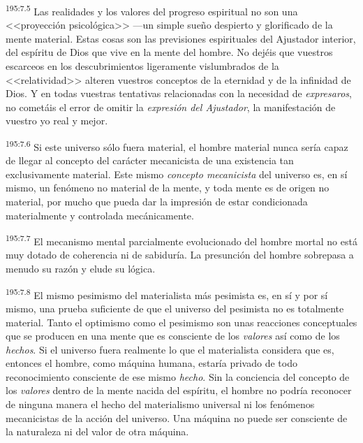 \par 
\textsuperscript{195:7.5} Las realidades y los valores del progreso espiritual no son una <<proyección psicológica>> ---un simple sueño despierto y glorificado de la mente material. Estas cosas son las previsiones espirituales del Ajustador interior, del espíritu de Dios que vive en la mente del hombre. No dejéis que vuestros escarceos en los descubrimientos ligeramente vislumbrados de la <<relatividad>> alteren vuestros conceptos de la eternidad y de la infinidad de Dios. Y en todas vuestras tentativas relacionadas con la necesidad de \textit{expresaros}, no cometáis el error de omitir la \textit{expresión del Ajustador}, la manifestación de vuestro yo real y mejor.

\par 
\textsuperscript{195:7.6} Si este universo sólo fuera material, el hombre material nunca sería capaz de llegar al concepto del carácter mecanicista de una existencia tan exclusivamente material. Este mismo \textit{concepto mecanicista} del universo es, en sí mismo, un fenómeno no material de la mente, y toda mente es de origen no material, por mucho que pueda dar la impresión de estar condicionada materialmente y controlada mecánicamente.

\par 
\textsuperscript{195:7.7} El mecanismo mental parcialmente evolucionado del hombre mortal no está muy dotado de coherencia ni de sabiduría. La presunción del hombre sobrepasa a menudo su razón y elude su lógica.

\par 
\textsuperscript{195:7.8} El mismo pesimismo del materialista más pesimista es, en sí y por sí mismo, una prueba suficiente de que el universo del pesimista no es totalmente material. Tanto el optimismo como el pesimismo son unas reacciones conceptuales que se producen en una mente que es consciente de los \textit{valores} así como de los \textit{hechos}. Si el universo fuera realmente lo que el materialista considera que es, entonces el hombre, como máquina humana, estaría privado de todo reconocimiento consciente de ese mismo \textit{hecho}. Sin la conciencia del concepto de los \textit{valores} dentro de la mente nacida del espíritu, el hombre no podría reconocer de ninguna manera el hecho del materialismo universal ni los fenómenos mecanicistas de la acción del universo. Una máquina no puede ser consciente de la naturaleza ni del valor de otra máquina.

